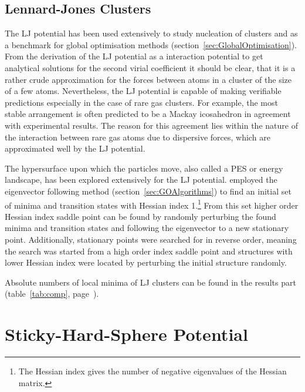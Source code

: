 \subsection{Lennard-Jones Clusters}
\label{sec:LJClusters}

The \ac{LJ} potential has been used extensively to study nucleation of clusters
and as a benchmark for global optimisation methods
(section~\ref{sec:GlobalOptimisation}). From the derivation of the \ac{LJ}
potential as a interaction potential to get analytical solutions for the second
virial coefficient it should be clear, that it is a rather crude approximation
for the forces between atoms in a cluster of the size of a few atoms.
Nevertheless, the \ac{LJ} potential is capable of making verifiable predictions
especially in the case of rare gas
clusters.\autocite{Wales_Energylandscapes_2003} For example, the most stable
arrangement is often predicted to be a Mackay icosahedron in agreement with
experimental results.\autocite{Kakar_SizedependentKedgeEXAFS_1997} The reason
for this agreement lies within the nature of the interaction between rare gas
atoms due to dispersive forces, which are approximated well by the \ac{LJ}
potential.

The hypersurface upon which the particles move, also called a \ac{PES} or energy
landscape, has been explored extensively for the \ac{LJ} potential.
\autocite{Tsai_Useeigenmodemethod_1993,Ball_Dynamicsstatisticalsamples_1999,Doye_Saddlepointsdynamics_2002} \citeauthor{Doye_Saddlepointsdynamics_2002}\autocite{Doye_Saddlepointsdynamics_2002}
employed the eigenvector following method (section~\ref{sec:GOAlgorithms}) to
find an initial set of minima and transition states with Hessian index
1.\footnote{The Hessian index gives the number of negative eigenvalues of the
Hessian matrix.} From this set higher order Hessian index saddle point can be
found by randomly perturbing the found minima and transition states and
following the eigenvector to a new stationary point. Additionally, stationary
points were searched for in reverse order, meaning the search was started from a
high order index saddle point and structures with lower Hessian index were
located by perturbing the initial structure randomly.

Absolute numbers of local minima of \ac{LJ} clusters can be found in the results
part (table~\ref{tab:comp}, page~\pageref{tab:comp}).

\section{Sticky-Hard-Sphere Potential}
\label{sec:SHS}

